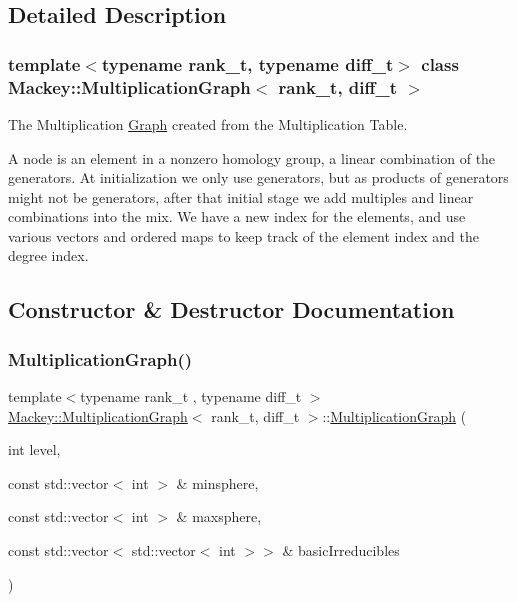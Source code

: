 \subsection{Detailed Description}
\subsubsection*{template$<$typename rank\+\_\+t, typename diff\+\_\+t$>$\newline
class Mackey\+::\+Multiplication\+Graph$<$ rank\+\_\+t, diff\+\_\+t $>$}

The Multiplication \hyperlink{classMackey_1_1Graph}{Graph} created from the Multiplication Table. 

A node is an element in a nonzero homology group, a linear combination of the generators. At initialization we only use generators, but as products of generators might not be generators, after that initial stage we add multiples and linear combinations into the mix. We have a new index for the elements, and use various vectors and ordered maps to keep track of the element index and the degree index. 

\subsection{Constructor \& Destructor Documentation}
\mbox{\label{classMackey_1_1MultiplicationGraph_a3f974791242d9e13ddca520df4265aca}} 
\subsubsection{\texorpdfstring{Multiplication\+Graph()}{MultiplicationGraph()}\hspace{0.1cm}{\footnotesize\ttfamily [1/2]}}
{\footnotesize\ttfamily template$<$typename rank\+\_\+t , typename diff\+\_\+t $>$ \\
\hyperlink{classMackey_1_1MultiplicationGraph}{Mackey\+::\+Multiplication\+Graph}$<$ rank\+\_\+t, diff\+\_\+t $>$\+::\hyperlink{classMackey_1_1MultiplicationGraph}{Multiplication\+Graph} (\begin{DoxyParamCaption}\item[{int}]{level,  }\item[{const std\+::vector$<$ int $>$ \&}]{minsphere,  }\item[{const std\+::vector$<$ int $>$ \&}]{maxsphere,  }\item[{const std\+::vector$<$ std\+::vector$<$ int $>$$>$ \&}]{basic\+Irreducibles }\end{DoxyParamCaption})\hspace{0.3cm}{\ttfamily [protected]}}



